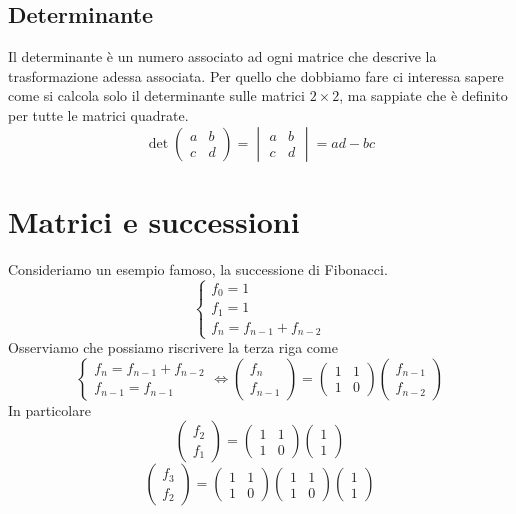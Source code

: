 \documentclass{article}     %
\begin{document}
\subsection{Determinante}
Il determinante è un numero associato ad ogni matrice che descrive la trasformazione adessa associata. Per quello che dobbiamo fare ci interessa sapere come si calcola solo il determinante sulle matrici $2\times 2$, ma sappiate che è definito per tutte le matrici quadrate. 
\[\det \begin{pmatrix} a&b\\c&d \end{pmatrix} = \begin{vmatrix} a&b\\c&d \end{vmatrix} = ad - bc\]
\section{Matrici e successioni}
Consideriamo un esempio famoso, la successione di Fibonacci. 
\[\begin{cases} f_0 = 1\\f_1 = 1\\f_n = f_{n - 1} + f_{n - 2} \end{cases} \]
Osserviamo che possiamo riscrivere la terza riga come 
\[\begin{cases} f_n = f_{n - 1} + f_{n - 2}\\ f_{n - 1} = f_{n - 1} \end{cases} \Longleftrightarrow \begin{pmatrix} f_n\\f_{n - 1} \end{pmatrix} = \begin{pmatrix} 1&1\\1&0 \end{pmatrix} \begin{pmatrix} f_{n - 1}\\f_{n - 2} \end{pmatrix} \]
In particolare
\[\begin{pmatrix} f_2\\f_1 \end{pmatrix} = \begin{pmatrix} 1&1\\1&0 \end{pmatrix} \begin{pmatrix} 1\\1 \end{pmatrix}\]
\[\begin{pmatrix} f_3\\f_2 \end{pmatrix} = \begin{pmatrix} 1&1\\1&0 \end{pmatrix}\begin{pmatrix} 1&1\\1&0 \end{pmatrix} \begin{pmatrix} 1\\1 \end{pmatrix}\]
\end{document}
